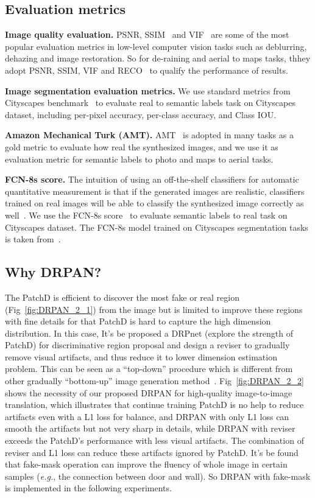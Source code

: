 \documentclass[10pt,twocolumn,letterpaper]{article}
\begin{document}
  \subsection{Evaluation metrics}
  \textbf{Image quality evaluation.} PSNR, SSIM~\cite{Wang2004Image} and VIF~\cite{Sheikh2006Image} are some of the most popular evaluation metrics in low-level computer vision tasks such as deblurring, dehazing and image restoration. So for de-raining and aerial to maps tasks, thhey adopt PSNR, SSIM, VIF and RECO~\cite{Baroncini2015The} to qualify the performance of results.\par
 \textbf{Image segmentation evaluation metrics.} We use standard metrics from Cityscapes benchmark~\cite{Cordts2016The} to evaluate real to semantic labels task on Cityscapes dataset, including per-pixel accuracy, per-class accuracy, and Class IOU.\par
 \textbf{Amazon Mechanical Turk (AMT).} AMT~\cite{Isola2016Image,Zhu2017Unpaired,Yi2017DualGAN} is adopted in many tasks as a gold metric to evaluate how real the synthesized images, and we use it as evaluation metric for semantic labels to photo and maps to aerial tasks.\par
 \textbf{FCN-8s score.} The intuition of using an off-the-shelf classifiers for automatic quantitative measurement is that if the generated images are realistic, classifiers trained on real images will be able to classify the synthesized image correctly as well~\cite{Isola2016Image}. We use the FCN-8s score~\cite{Long2015Fully} to evaluate semantic labels to real task on Cityscapes dataset. The FCN-8s model trained on Cityscapes segmentation tasks is taken from~\cite{Isola2016Image}.\par
 \subsection{Why DRPAN?}
The PatchD is efficient to discover the most fake or real region (Fig~\ref{fig:DRPAN_2_1}) from the image but is limited to improve these regions with fine details for that PatchD is hard to capture the high dimension distribution. In this case, It's be proposed a DRPnet (explore the strength of PatchD) for discriminative region proposal and design a reviser to gradually remove visual artifacts, and thus reduce it to lower dimension estimation problem. This can be seen as a “top-down” procedure which is different from other gradually “bottom-up” image generation method~\cite{Zhang2017StackGAN}. Fig~\ref{fig:DRPAN_2_2} shows the necessity of our proposed DRPAN for high-quality image-to-image translation, which illustrates that continue training PatchD is no help to reduce artifacts even with a L1 loss for balance, and DRPAN with only L1 loss can smooth the artifacts but not very sharp in details, while DRPAN with reviser exceeds the PatchD’s performance with less visual artifacts. The combination of reviser and L1 loss can reduce these artifacts ignored by PatchD. It's be found that fake-mask operation can improve the fluency of whole image in certain samples (\emph{e.g.}, the connection between door and wall). So DRPAN with fake-mask is implemented in the following experiments.
\end{document}
